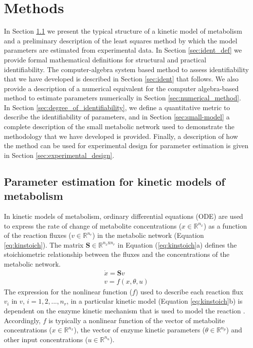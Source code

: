 \documentclass[10pt]{article}
\begin{document}
	\section{Methods}\label{sec:methods}
	In Section \ref{sec:kinetic_model} we present the typical structure of a kinetic model of metabolism and a preliminary description of the least squares method by which the model parameters are estimated from experimental data. In Section \ref{sec:ident_def} we provide formal mathematical definitions for structural and practical identifiability. The computer-algebra system based method to assess identifiability that we have developed is described in Section \ref{sec:ident} that follows. We also provide a description of a numerical equivalent for the computer algebra-based method to estimate parameters numerically in Section \ref{sec:numerical_method}. In Section \ref{sec:degree_of_identifiability}, we define a quantitative metric to describe the identifiability of parameters, and in Section \ref{sec:small-model} a complete description of the small metabolic network used to demonstrate the methodology that we have developed is provided. Finally, a description of how the method can be used for experimental design for parameter estimation is given in Section \ref{sec:experimental_design}.
	
	\subsection{Parameter estimation for kinetic models of metabolism}\label{sec:kinetic_model}
	In kinetic models of metabolism, ordinary differential equations (ODE) are used to express the rate of change of metabolite concentrations ($x\in\mathbb{R}^{n_x}$) as a function of the reaction fluxes ($v\in\mathbb{R}^{n_r}$) in the metabolic network (Equation \ref{eq:kinstoich}). The matrix $\mathbf{S}\in\mathbb{R}^{n_x \text{x} n_r}$ in Equation (\ref{eq:kinstoich}a) defines the stoichiometric relationship between the fluxes and the concentrations of the metabolic network.
	\begin{subequations}\label{eq:kinstoich}
		\begin{align}
		\dot{x} = \mathbf{S}v\\
		v = f(x, \theta, u)
		\end{align}
	\end{subequations}
	The expression for the nonlinear function ($f$) used to describe each reaction flux $v_i$ in $v$, $i={1, 2, ..., n_r}$, in a particular kinetic model (Equation \ref{eq:kinstoich}b) is dependent on the enzyme kinetic mechanism that is used to model the reaction \parencite{Srinivasan2015}. Accordingly, $f$ is typically a nonlinear function of the vector of metabolite concentrations ($x\in \mathbb{R}^{n_x}$), the vector of enzyme kinetic parameters ($\theta\in\mathbb{R}^{n_p}$) and other input concentrations ($u \in \mathbb{R}^{n_u}$). 
	
\end{document}
